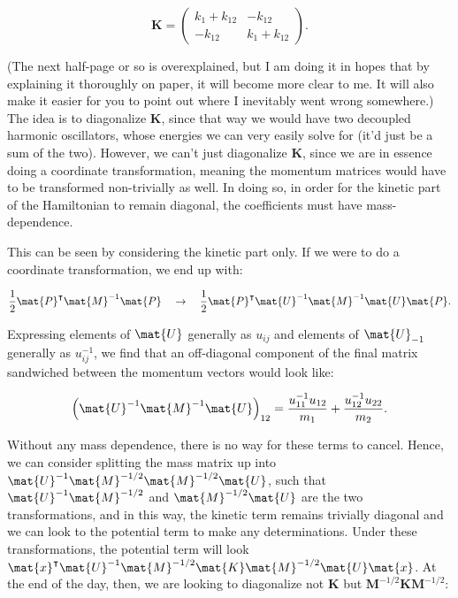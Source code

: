 \begin{equation}
  \mathbf{K} = \begin{pmatrix}k_1 + k_{12} & -k_{12} \\ -k_{12} & k_1 + k_{12}\end{pmatrix}.
\end{equation}

(The next half-page or so is overexplained, but I am doing it in hopes that by explaining it thoroughly on paper, it will become more clear to me. It will also make it easier for you to point out where I inevitably went wrong somewhere.) The idea is to diagonalize $\mathbf{K}$, since that way we would have two decoupled harmonic oscillators, whose energies we can very easily solve for (it'd just be a sum of the two). However, we can't just diagonalize $\mathbf{K}$, since we are in essence doing a coordinate transformation, meaning the momentum matrices would have to be transformed non-trivially as well. In doing so, in order for the kinetic part of the Hamiltonian to remain diagonal, the coefficients must have mass-dependence.

This can be seen by considering the kinetic part only. If we were to do a coordinate transformation, we end up with:

\begin{equation}
  \frac{1}{2}\mat{P}^\intercal \mat{M}^{-1} \mat{P} \quad\rightarrow\quad \frac{1}{2}\mat{P}^\intercal \mat{U}^{-1} \mat{M}^{-1} \mat{U} \mat{P}.
\end{equation}

Expressing elements of $\mat{U}$ generally as $u_{ij}$ and elements of $\mat{U}_{-1}$ generally as $u^{-1}_{ij}$, we find that an off-diagonal component of the final matrix sandwiched between the momentum vectors would look like:

\begin{equation}
  \left(\mat{U}^{-1}\mat{M}^{-1}\mat{U}\right)_{12} = \frac{u^{-1}_{11}u_{12}}{m_1} + \frac{u^{-1}_{12}u_{22}}{m_2}.
\end{equation}

Without any mass dependence, there is no way for these terms to cancel. Hence, we can consider splitting the mass matrix up into $\mat{U}^{-1}\mat{M}^{-1/2}\mat{M}^{-1/2}\mat{U}$, such that $\mat{U}^{-1}\mat{M}^{-1/2}$ and $\mat{M}^{-1/2}\mat{U}$ are the two transformations, and in this way, the kinetic term remains trivially diagonal and we can look to the potential term to make any determinations. Under these transformations, the potential term will look $\mat{x}^\intercal\mat{U}^{-1}\mat{M}^{-1/2}\mat{K}\mat{M}^{-1/2}\mat{U}\mat{x}$. At the end of the day, then, we are looking to diagonalize not $\mathbf{K}$ but $\mathbf{M}^{-1/2}\mathbf{K}\mathbf{M}^{-1/2}$:

